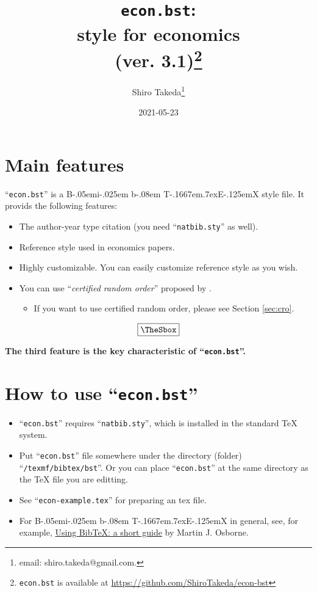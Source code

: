 \documentclass[10pt]{article}
\title{\texttt{econ.bst}:\\
\BibTeX{} style for economics\\(ver. 3.1)\thanks{\texttt{econ.bst} is available at
\url{https://github.com/ShiroTakeda/econ-bst}}
}
\author{Shiro Takeda\thanks{email: {\ttfamily shiro.takeda@gmail.com}.}}
\date{2021-05-23}
\newenvironment{Frame}%
{\setlength{\fboxsep}{15pt}
\setlength{\mylength}{\linewidth}%
\addtolength{\mylength}{-2\fboxsep}%
\addtolength{\mylength}{-2\fboxrule}%
\Sbox
\minipage{\mylength}%
\setlength{\abovedisplayskip}{0pt}%
\setlength{\belowdisplayskip}{0pt}%
}%
{\endminipage\endSbox
\[\fbox{\TheSbox}\]}
\def\BibTeX{{\rm B\kern-.05em{\sc i\kern-.025em b}\kern-.08em
    T\kern-.1667em\lower.7ex\hbox{E}\kern-.125emX}}
\begin{document}
\maketitle

\newlength{\mylength}
\setlength{\fboxsep}{15pt}
\setlength{\mylength}{\linewidth}
\addtolength{\mylength}{-2\fboxsep}
\addtolength{\mylength}{-2\fboxrule}

\tableofcontents


\setlength{\baselineskip}{16pt}

\section{Main features}

``\texttt{econ.bst}'' is a \BibTeX{} style file. It provids the following
features:
\begin{Frame}
 \begin{itemize}
  \item The author-year type citation (you need ``\texttt{natbib.sty}'' as well).
  \item Reference style used in economics papers.
  \item Highly customizable.  You can easily customize reference style as you
        wish.
  \item You can use ``\textit{certified random order}'' proposed by
        \href{http://dx.doi.org/10.1257/aer.20161492}{\citet[][AER]{10.1257/aer.20161492}}.
        \begin{itemize}
         \item If you want to use certified random order, please see Section
               \ref{sec:cro}.
        \end{itemize}
 \end{itemize}
\end{Frame}

\textbf{The third feature is the key characteristic of ``\texttt{econ.bst}''.}

\section{How to use ``\texttt{econ.bst}''}

\begin{itemize}
 \item ``\texttt{econ.bst}'' requires ``\texttt{natbib.sty}'', which is
       installed in the standard \TeX{} system.
 \item Put ``\texttt{econ.bst}'' file somewhere under the directory (folder)
       ``\texttt{/texmf/bibtex/bst}''. Or you can place ``\texttt{econ.bst}'' at
       the same directory as the \TeX{} file you are editting.
 \item See ``\texttt{econ-example.tex}'' for preparing an tex file.
 \item For \BibTeX{} in general, see, for example,
       \href{https://www.economics.utoronto.ca/osborne/latex/BIBTEX.HTM}{Using
       BibTeX: a short guide} by Martin J. Osborne.
\end{itemize}
\end{document}
